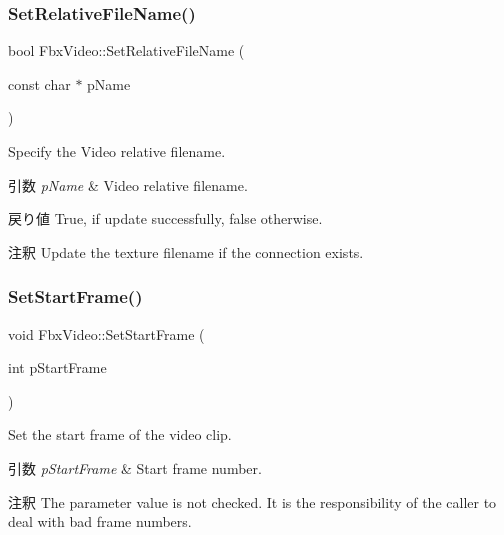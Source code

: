 \subsubsection{\texorpdfstring{Set\+Relative\+File\+Name()}{SetRelativeFileName()}}
{\footnotesize\ttfamily bool Fbx\+Video\+::\+Set\+Relative\+File\+Name (\begin{DoxyParamCaption}\item[{const char $\ast$}]{p\+Name }\end{DoxyParamCaption})}

Specify the Video relative filename. 
\begin{DoxyParams}{引数}
{\em p\+Name} & Video relative filename. \\
\hline
\end{DoxyParams}
\begin{DoxyReturn}{戻り値}
{\ttfamily True}, if update successfully, {\ttfamily false} otherwise. 
\end{DoxyReturn}
\begin{DoxyRemark}{注釈}
Update the texture filename if the connection exists. 
\end{DoxyRemark}
\mbox{\label{class_fbx_video_a85a31f27e4cca068fd285385998bcad5}} 
\subsubsection{\texorpdfstring{Set\+Start\+Frame()}{SetStartFrame()}}
{\footnotesize\ttfamily void Fbx\+Video\+::\+Set\+Start\+Frame (\begin{DoxyParamCaption}\item[{int}]{p\+Start\+Frame }\end{DoxyParamCaption})}

Set the start frame of the video clip. 
\begin{DoxyParams}{引数}
{\em p\+Start\+Frame} & Start frame number. \\
\hline
\end{DoxyParams}
\begin{DoxyRemark}{注釈}
The parameter value is not checked. It is the responsibility of the caller to deal with bad frame numbers. 
\end{DoxyRemark}
\mbox{\label{class_fbx_video_aa7dd98bc975a79daf988c395be2199cd}} 
